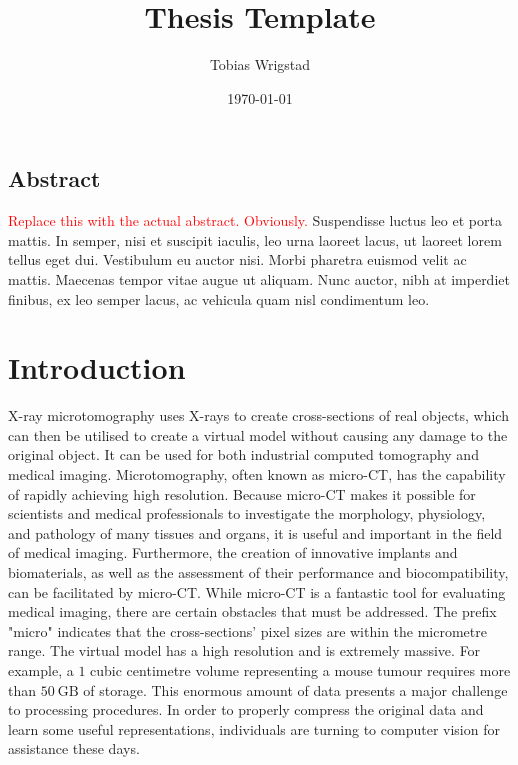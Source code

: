\documentclass[11pt,titlepage,openright]{book}
\newcommand{\RED}[1]{\textcolor{red}{#1}}
\begin{document}
\frontmatter
\title{Thesis Template}
\author{Tobias Wrigstad}
\date{\today}

\maketitle

\vspace*{3cm}
\section*{Abstract}

\RED{Replace this with the actual abstract. Obviously.}
Suspendisse luctus leo et porta mattis. In semper, nisi et
suscipit iaculis, leo urna laoreet lacus, ut laoreet lorem tellus
eget dui. Vestibulum eu auctor nisi. Morbi pharetra euismod velit
ac mattis. Maecenas tempor vitae augue ut aliquam. Nunc auctor,
nibh at imperdiet finibus, ex leo semper lacus, ac vehicula quam
nisl condimentum leo.


\tableofcontents

\mainmatter

\chapter{Introduction}

X-ray microtomography uses X-rays to create cross-sections of real objects, which can then be utilised to create a virtual model without causing any damage to the original object. It can be used for both industrial computed tomography and medical imaging. Microtomography, often known as micro-CT, has the capability of rapidly achieving high resolution. Because micro-CT makes it possible for scientists and medical professionals to investigate the morphology, physiology, and pathology of many tissues and organs, it is useful and important in the field of medical imaging. Furthermore, the creation of innovative implants and biomaterials, as well as the assessment of their performance and biocompatibility, can be facilitated by micro-CT. While micro-CT is a fantastic tool for evaluating medical imaging, there are certain obstacles that must be addressed. The prefix "micro" indicates that the cross-sections' pixel sizes are within the micrometre range. The virtual model has a high resolution and is extremely massive. For example, a $1$ cubic centimetre volume representing a mouse tumour requires more than $50\:\text{GB}$ of storage. This enormous amount of data presents a major challenge to processing procedures. In order to properly compress the original data and learn some useful representations, individuals are turning to computer vision for assistance these days. 
\end{document}
